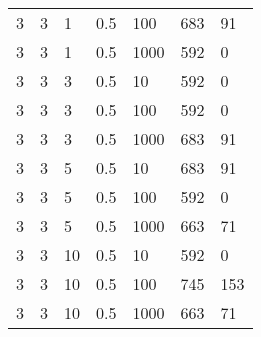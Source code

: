 \begin{longtable}{ | l | l | l | l | l | l | l |}
	3 & 3 & 1 & 0.5 & 100 & 683 & 91 \\ 
	3 & 3 & 1 & 0.5 & 1000 & 592 & 0 \\ 
	3 & 3 & 3 & 0.5 & 10 & 592 & 0 \\ 
	3 & 3 & 3 & 0.5 & 100 & 592 & 0 \\ 
	3 & 3 & 3 & 0.5 & 1000 & 683 & 91 \\ 
	3 & 3 & 5 & 0.5 & 10 & 683 & 91 \\ 
	3 & 3 & 5 & 0.5 & 100 & 592 & 0 \\
	3 & 3 & 5 & 0.5 & 1000 & 663 & 71 \\ 
	3 & 3 & 10 & 0.5 & 10 & 592 & 0 \\ 
	3 & 3 & 10 & 0.5 & 100 & 745 & 153 \\ 
	3 & 3 & 10 & 0.5 & 1000 & 663 & 71 \\ 
	\hline
\end{longtable}
\FloatBarrier
